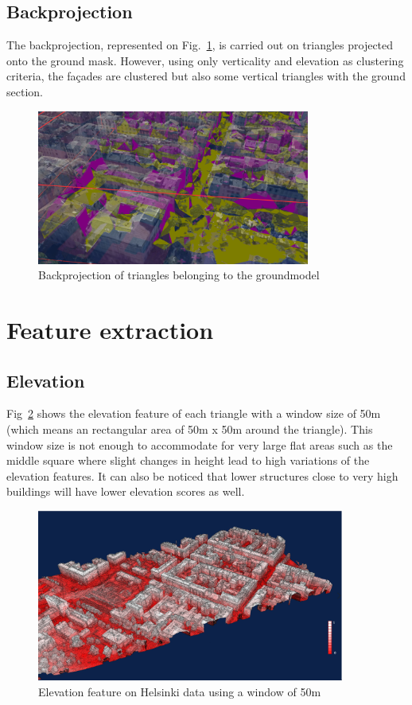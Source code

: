 \documentclass{kththesis}
\begin{document}
\subsection{Backprojection}
The backprojection, represented on Fig.~\ref{fig:backproj}, is carried out on triangles projected onto the ground mask. However, using only verticality and elevation as clustering criteria, the façades are clustered but also some vertical triangles with the ground section. 
\begin{figure}[H]
    \centering
    \includegraphics[width=0.8\textwidth]{images/Results/3D_triangles_ground.png}
    \caption{Backprojection of triangles belonging to the groundmodel}
    \label{fig:backproj}
\end{figure}

\newpage
\section{Feature extraction}
\label{sec:ft_extr_appendix}
\subsection{Elevation} 
Fig~\ref{fig:elev_Helsinki} shows the elevation feature of each triangle with a window size of 50m (which means an rectangular area of 50m x 50m around the triangle). This window size is not enough to accommodate for very large flat areas such as the middle square where slight changes in height lead to high variations of the elevation features. It can also be noticed that lower structures close to very high buildings will have lower elevation scores as well. 

\begin{figure}[H]
    \centering
    \includegraphics[width=0.9\textwidth]{images/features/elevation_50_Helsinki.png}
    \caption{Elevation feature on Helsinki data using a window of 50m}
    \label{fig:elev_Helsinki}
\end{figure}
\end{document}
